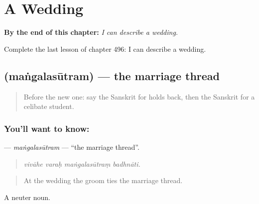 
\chapter{A Wedding}
\label{ch:sa-a-wedding}

\begin{chapteropening}
\textbf{By the end of this chapter:} \emph{I can describe a wedding.}

Complete the last lesson of chapter 496: I can describe a wedding.
\end{chapteropening}

\section[\texorpdfstring{\sk{मंगलसूत्रम्} (maṅgalasūtram)}{मंगलसूत्रम् (maṅgalasūtram)}]{ (maṅgalasūtram) — the marriage thread}

\label{lesson:SA-C496-mangalasutram}



\begin{quote}
Before the new one: say the Sanskrit for holds back, then the Sanskrit for a celibate student.
\end{quote}

\subsection*{You'll want to know: }
\textbf{} — \emph{maṅgalasūtram} — \textquotedblleft{}the marriage thread\textquotedblright{}.

\begin{quote}
   
\end{quote}

\begin{quote}
\emph{vivāhe varaḥ maṅgalasūtraṃ badhnāti.}
\end{quote}

\begin{quote}
At the wedding the groom ties the marriage thread.
\end{quote}

A neuter noun.

